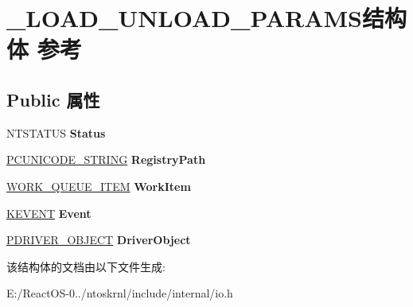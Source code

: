 \hypertarget{struct___l_o_a_d___u_n_l_o_a_d___p_a_r_a_m_s}{}\section{\+\_\+\+L\+O\+A\+D\+\_\+\+U\+N\+L\+O\+A\+D\+\_\+\+P\+A\+R\+A\+M\+S结构体 参考}
\label{struct___l_o_a_d___u_n_l_o_a_d___p_a_r_a_m_s}
\subsection*{Public 属性}
\begin{DoxyCompactItemize}
\item 
\mbox{\label{struct___l_o_a_d___u_n_l_o_a_d___p_a_r_a_m_s_a0873879312b77cb4345ce0f7b6c3dd24}} 
N\+T\+S\+T\+A\+T\+US {\bfseries Status}
\item 
\mbox{\label{struct___l_o_a_d___u_n_l_o_a_d___p_a_r_a_m_s_a68b98b13b10bc7a32dc483997bc46414}} 
\hyperlink{struct___u_n_i_c_o_d_e___s_t_r_i_n_g}{P\+C\+U\+N\+I\+C\+O\+D\+E\+\_\+\+S\+T\+R\+I\+NG} {\bfseries Registry\+Path}
\item 
\mbox{\label{struct___l_o_a_d___u_n_l_o_a_d___p_a_r_a_m_s_a0395027b9f688a70c102e7cb01696203}} 
\hyperlink{struct___w_o_r_k___q_u_e_u_e___i_t_e_m}{W\+O\+R\+K\+\_\+\+Q\+U\+E\+U\+E\+\_\+\+I\+T\+EM} {\bfseries Work\+Item}
\item 
\mbox{\label{struct___l_o_a_d___u_n_l_o_a_d___p_a_r_a_m_s_a8b6d5f4a9a64eacc7e2b61082374b139}} 
\hyperlink{struct___k_e_v_e_n_t}{K\+E\+V\+E\+NT} {\bfseries Event}
\item 
\mbox{\label{struct___l_o_a_d___u_n_l_o_a_d___p_a_r_a_m_s_aec96717639a93639a7a3635397420557}} 
\hyperlink{struct___d_r_i_v_e_r___o_b_j_e_c_t}{P\+D\+R\+I\+V\+E\+R\+\_\+\+O\+B\+J\+E\+CT} {\bfseries Driver\+Object}
\end{DoxyCompactItemize}


该结构体的文档由以下文件生成\+:\begin{DoxyCompactItemize}
\item 
E\+:/\+React\+O\+S-\/0../ntoskrnl/include/internal/io.\+h\end{DoxyCompactItemize}
